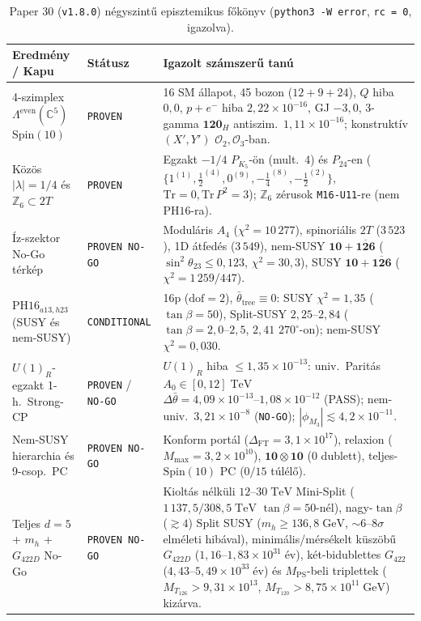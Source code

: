 \documentclass[11pt,a4paper]{article}
\begin{document}
\begin{table}[t!]
\centering
\caption{Paper 30 (\texttt{v1.8.0}) négyszintű episztemikus főkönyv (\texttt{python3 -W error}, \texttt{rc = 0}, igazolva).}
\label{tab:ledger-hu}
\scriptsize
\begin{tabular}{p{3.9cm}p{2.0cm}p{9.2cm}}
\toprule
Eredmény / Kapu & Státusz & Igazolt számszerű tanú \\
\midrule
4-szimplex $\Lambda^{\mathrm{even}}(\mathbb{C}^5)$ $\mathrm{Spin}(10)$ & \texttt{PROVEN} & 16 SM állapot, 45 bozon ($12+9+24$), $Q$ hiba $0{,}0$, $p+e^-$ hiba $2{,}22\times 10^{-16}$, GJ $-3{,}0$, 3-gamma $\mathbf{120}_H$ antiszim.\ $1{,}11\times 10^{-16}$; konstruktív $(X',Y')$ $\mathcal{O}_2,\mathcal{O}_3$-ban. \\
Közös $|\lambda|=1/4$ és $\mathbb{Z}_6\subset 2T$ & \texttt{PROVEN} & Egzakt $-1/4$ $P_{K_5}$-ön (mult.\ 4) és $P_{24}$-en ($\{1^{(1)},\tfrac{1}{2}^{(4)},0^{(9)},-\tfrac{1}{4}^{(8)},-\tfrac{1}{2}^{(2)}\}$, $\mathrm{Tr}=0,\mathrm{Tr}\,P^2=3$); $\mathbb{Z}_6$ zérusok \texttt{M16-U11}-re (nem $\mathrm{PH16}$-ra). \\
Íz-szektor No-Go térkép & \texttt{PROVEN NO-GO} & Moduláris $A_4$ ($\chi^2=10\,277$), spinoriális $2T$ ($3\,523$), 1D átfedés ($3\,549$), nem-SUSY $\mathbf{10}+\overline{\mathbf{126}}$ ($\sin^2\theta_{23}\le 0{,}123$, $\chi^2=30{,}3$), SUSY $\mathbf{10}+\overline{\mathbf{126}}$ ($\chi^2=1\,259/447$). \\
$\mathrm{PH16}_{a13,h23}$ (SUSY és nem-SUSY) & \texttt{CONDITIONAL} & 16p ($\mathrm{dof}=2$), $\bar\theta_{\mathrm{tree}}\equiv 0$: SUSY $\chi^2=1{,}35$ ($\tan\beta=50$), Split-SUSY $2{,}25\text{--}2{,}84$ ($\tan\beta=2{,}0\text{--}2{,}5$, $2{,}41$ $270^\circ$-on); nem-SUSY $\chi^2=0{,}030$. \\
$U(1)_R$-egzakt 1-h.\ Strong-CP & \texttt{PROVEN} / \texttt{NO-GO} & $U(1)_R$ hiba $\le 1{,}35\times 10^{-13}$: univ.\ Paritás $A_0\in[0,12]\;\mathrm{TeV}$ $\Delta\bar\theta = 4{,}09\times 10^{-13}\text{--}1{,}08\times 10^{-12}$ (PASS); nem-univ.\ $3{,}21\times 10^{-8}$ (\texttt{NO-GO}); $|\phi_{M_3}|\lesssim 4{,}2\times 10^{-11}$. \\
Nem-SUSY hierarchia és 9-csop.\ PC & \texttt{PROVEN NO-GO} & Konform portál ($\Delta_{\mathrm{FT}}=3{,}1\times 10^{17}$), relaxion ($M_{\max}=3{,}2\times 10^{10}$), $\mathbf{10}\otimes\mathbf{10}$ (0 dublett), teljes-$\mathrm{Spin}(10)$ PC ($0/15$ túlélő). \\
Teljes $d=5$ + $m_h$ + $G_{422D}$ No-Go & \texttt{PROVEN NO-GO} & Kioltás nélküli $12\text{--}30\;\mathrm{TeV}$ Mini-Split ($1\,137{,}5 / 308{,}5\;\mathrm{TeV}$ $\tan\beta=50$-nél), nagy-$\tan\beta$ ($\gtrsim 4$) Split SUSY ($m_h\ge 136{,}8\;\mathrm{GeV}$, $\sim 6\text{--}8\sigma$ elméleti hibával), minimális/mérsékelt küszöbű $G_{422D}$ ($1{,}16\text{--}1{,}83\times 10^{31}\;\text{év}$), két-bidublettes $G_{422}$ ($4{,}43\text{--}5{,}49\times 10^{33}\;\text{év}$) és $M_{\mathrm{PS}}$-beli triplettek ($M_{T_{126}}>9{,}31\times 10^{13}$, $M_{T_{120}}>8{,}75\times 10^{11}\;\mathrm{GeV}$) kizárva. \\

\end{tabular}
\end{table}
\end{document}
